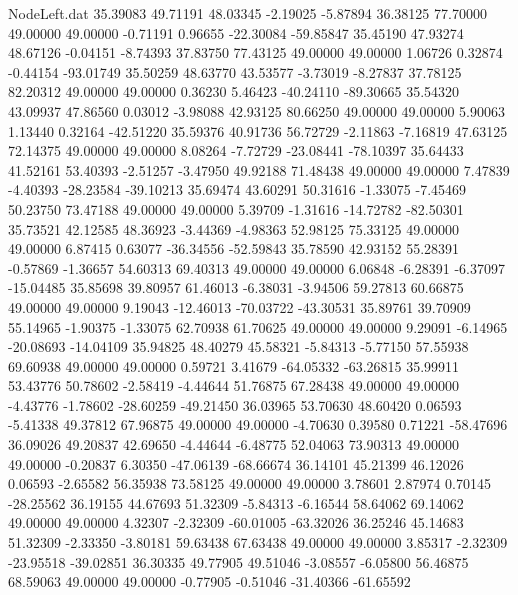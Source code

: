 \begin{filecontents}{NodeLeft.dat}
  35.39083   49.71191   48.03345    -2.19025   -5.87894   36.38125   77.70000   49.00000   49.00000   -0.71191    0.96655  -22.30084  -59.85847
  35.45190   47.93274   48.67126    -0.04151   -8.74393   37.83750   77.43125   49.00000   49.00000    1.06726    0.32874   -0.44154  -93.01749
  35.50259   48.63770   43.53577    -3.73019   -8.27837   37.78125   82.20312   49.00000   49.00000    0.36230    5.46423  -40.24110  -89.30665
  35.54320   43.09937   47.86560     0.03012   -3.98088   42.93125   80.66250   49.00000   49.00000    5.90063    1.13440    0.32164  -42.51220
  35.59376   40.91736   56.72729    -2.11863   -7.16819   47.63125   72.14375   49.00000   49.00000    8.08264   -7.72729  -23.08441  -78.10397
  35.64433   41.52161   53.40393    -2.51257   -3.47950   49.92188   71.48438   49.00000   49.00000    7.47839   -4.40393  -28.23584  -39.10213
  35.69474   43.60291   50.31616    -1.33075   -7.45469   50.23750   73.47188   49.00000   49.00000    5.39709   -1.31616  -14.72782  -82.50301
  35.73521   42.12585   48.36923    -3.44369   -4.98363   52.98125   75.33125   49.00000   49.00000    6.87415    0.63077  -36.34556  -52.59843
  35.78590   42.93152   55.28391    -0.57869   -1.36657   54.60313   69.40313   49.00000   49.00000    6.06848   -6.28391   -6.37097  -15.04485
  35.85698   39.80957   61.46013    -6.38031   -3.94506   59.27813   60.66875   49.00000   49.00000    9.19043  -12.46013  -70.03722  -43.30531
  35.89761   39.70909   55.14965    -1.90375   -1.33075   62.70938   61.70625   49.00000   49.00000    9.29091   -6.14965  -20.08693  -14.04109
  35.94825   48.40279   45.58321    -5.84313   -5.77150   57.55938   69.60938   49.00000   49.00000    0.59721    3.41679  -64.05332  -63.26815
  35.99911   53.43776   50.78602    -2.58419   -4.44644   51.76875   67.28438   49.00000   49.00000   -4.43776   -1.78602  -28.60259  -49.21450
  36.03965   53.70630   48.60420     0.06593   -5.41338   49.37812   67.96875   49.00000   49.00000   -4.70630    0.39580    0.71221  -58.47696
  36.09026   49.20837   42.69650    -4.44644   -6.48775   52.04063   73.90313   49.00000   49.00000   -0.20837    6.30350  -47.06139  -68.66674
  36.14101   45.21399   46.12026     0.06593   -2.65582   56.35938   73.58125   49.00000   49.00000    3.78601    2.87974    0.70145  -28.25562
  36.19155   44.67693   51.32309    -5.84313   -6.16544   58.64062   69.14062   49.00000   49.00000    4.32307   -2.32309  -60.01005  -63.32026
  36.25246   45.14683   51.32309    -2.33350   -3.80181   59.63438   67.63438   49.00000   49.00000    3.85317   -2.32309  -23.95518  -39.02851
  36.30335   49.77905   49.51046    -3.08557   -6.05800   56.46875   68.59063   49.00000   49.00000   -0.77905   -0.51046  -31.40366  -61.65592

\end{filecontents}
